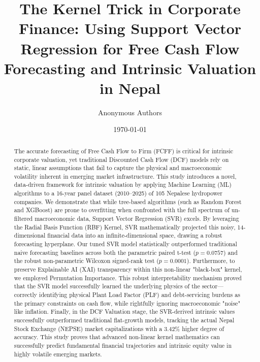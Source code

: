 \documentclass[11pt,a4paper]{article}
\title{The Kernel Trick in Corporate Finance: Using Support Vector Regression for Free Cash Flow Forecasting and Intrinsic Valuation in Nepal}
\author{Anonymous Authors}
\date{\today}
\begin{document}
\maketitle

\begin{abstract}
The accurate forecasting of Free Cash Flow to Firm (FCFF) is critical for intrinsic corporate valuation, yet traditional Discounted Cash Flow (DCF) models rely on static, linear assumptions that fail to capture the physical and macroeconomic volatility inherent in emerging market infrastructure. This study introduces a novel, data-driven framework for intrinsic valuation by applying Machine Learning (ML) algorithms to a 16-year panel dataset (2010--2025) of 105 Nepalese hydropower companies. We demonstrate that while tree-based algorithms (such as Random Forest and XGBoost) are prone to overfitting when confronted with the full spectrum of un-filtered macroeconomic data, Support Vector Regression (SVR) excels. By leveraging the Radial Basis Function (RBF) Kernel, SVR mathematically projected this noisy, 14-dimensional financial data into an infinite-dimensional space, drawing a robust forecasting hyperplane. Our tuned SVR model statistically outperformed traditional naive forecasting baselines across both the parametric paired t-test ($p = 0.0757$) and the robust non-parametric Wilcoxon signed-rank test ($p = 0.0001$). Furthermore, to preserve Explainable AI (XAI) transparency within this non-linear "black-box" kernel, we employed Permutation Importance. This robust interpretability mechanism proved that the SVR model successfully learned the underlying physics of the sector---correctly identifying physical Plant Load Factor (PLF) and debt-servicing burdens as the primary constraints on cash flow, while rightfully ignoring macroeconomic "noise" like inflation. Finally, in the DCF Valuation stage, the SVR-derived intrinsic values successfully outperformed traditional flat-growth models, tracking the actual Nepal Stock Exchange (NEPSE) market capitalizations with a 3.42\% higher degree of accuracy. This study proves that advanced non-linear kernel mathematics can successfully predict fundamental financial trajectories and intrinsic equity value in highly volatile emerging markets.
\end{abstract}
\end{document}
